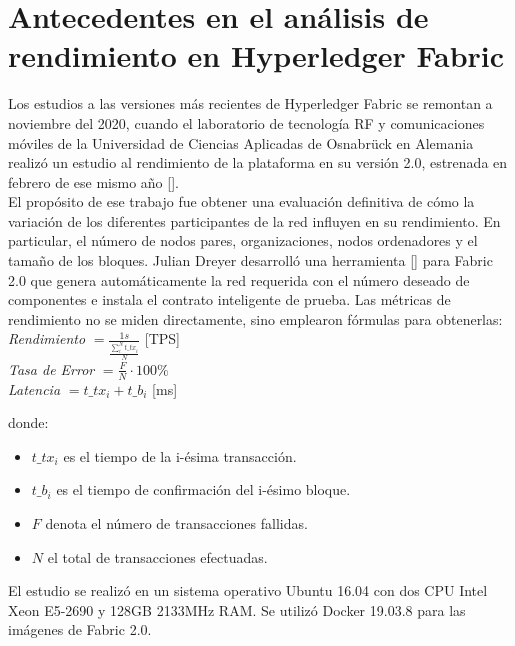 \chapter{Antecedentes en el an\'alisis de rendimiento en Hyperledger Fabric}\label{chapter:state-of-the-art}

Los estudios a las versiones m\'as recientes de Hyperledger Fabric se remontan a noviembre del 2020, cuando el laboratorio de tecnolog\'ia RF y comunicaciones m\'oviles de la Universidad de Ciencias Aplicadas de Osnabrück en Alemania realiz\'o un estudio al rendimiento de la plataforma en su versi\'on 2.0, estrenada en febrero de ese mismo a\~no [\cite{dreyer2020performance}].\\

El prop\'osito de ese trabajo fue obtener una evaluaci\'on definitiva de c\'omo la variaci\'on de los diferentes participantes de la red influyen en su rendimiento. En particular, el n\'umero de nodos pares, organizaciones, nodos ordenadores y el tama\~no de los bloques. Julian Dreyer desarroll\'o una herramienta [\cite{Configurator}] para Fabric 2.0 que genera autom\'aticamente la red requerida con el n\'umero deseado de componentes e instala el contrato inteligente de prueba. Las m\'etricas de rendimiento no se miden directamente, sino emplearon f\'ormulas para obtenerlas:\\

\emph{Rendimiento} $ = \frac{1s}{\frac{ \sum_i^N t\_tx_i } {N} }$ [TPS]\\

\emph{Tasa de Error} $ = \frac{F}{N} \cdot 100\% $\\


\emph{Latencia} $ = t\_tx_i + t\_b_i$ [ms]

{\vspace{1 cm}}

donde:
\begin{itemize}
\item $t\_tx_i$ es el tiempo de la i-\'esima transacci\'on.
\item $t\_b_i$ es el tiempo de confirmaci\'on del i-\'esimo bloque.
\item $F$ denota el n\'umero de transacciones fallidas.
\item $N$ el total de transacciones efectuadas.  
\end{itemize}

El estudio se realiz\'o en un sistema operativo Ubuntu 16.04 con dos CPU Intel Xeon E5-2690 y 128GB 2133MHz RAM. Se utiliz\'o Docker 19.03.8 para las im\'agenes de Fabric 2.0.\\

